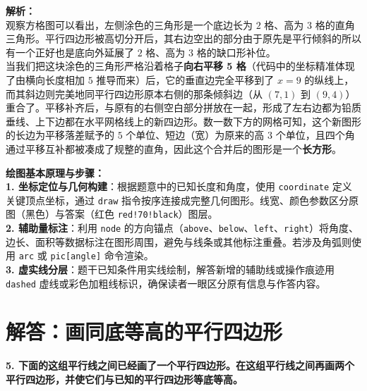 \vspace{0.6cm}
{\small\color{gray}
\textbf{解析：}\\
观察方格图可以看出，左侧涂色的三角形是一个底边长为 $2$ 格、高为 $3$ 格的直角三角形。平行四边形被高切分开后，其右边空出的部分由于原先是平行倾斜的所以有一个正好也是底向外延展了 $2$ 格、高为 $3$ 格的缺口形补位。\\
当我们把这块涂色的三角形严格沿着格子\textbf{向右平移 5 格}（代码中的坐标精准体现了由横向长度相加 $5$ 推导而来）后，它的垂直边完全平移到了 $x=9$ 的纵线上，而其斜边则完美地同平行四边形原本右侧的那条倾斜边（从 $(7,1)$ 到 $(9,4)$）重合了。平移补齐后，与原有的右侧空白部分拼放在一起，形成了左右边都为铅质垂线、上下边都在水平网格线上的新四边形。数一数下方的网格可知，这个新图形的长边为平移落差赋予的 $5$ 个单位、短边（宽）为原来的高 $3$ 个单位，且四个角通过平移互补都被凑成了规整的直角，因此这个合并后的图形是一个\textbf{长方形}。
}


\vspace{0.6cm}

{\small\color{blue!70!black}
\textbf{绘图基本原理与步骤：}\\
\textbf{1. 坐标定位与几何构建}：根据题意中的已知长度和角度，使用 \texttt{coordinate} 定义关键顶点坐标，通过 \texttt{draw} 指令按序连接成完整几何图形。线宽、颜色参数区分原图（黑色）与答案（红色 \texttt{red!70!black}）图层。\\
\textbf{2. 辅助量标注}：利用 \texttt{node} 的方向锚点（\texttt{above}、\texttt{below}、\texttt{left}、\texttt{right}）将角度、边长、面积等数据标注在图形周围，避免与线条或其他标注重叠。若涉及角弧则使用 \texttt{arc} 或 \texttt{pic[angle]} 命令渲染。\\
\textbf{3. 虚实线分层}：题干已知条件用实线绘制，解答新增的辅助线或操作痕迹用 \texttt{dashed} 虚线或彩色加粗线标识，确保读者一眼区分原有信息与作答内容。
}

\newpage



\section{解答：画同底等高的平行四边形}

\vspace{0.4cm}

\noindent\textbf{5. 下面的这组平行线之间已经画了一个平行四边形。在这组平行线之间再画两个平行四边形，并使它们与已知的平行四边形等底等高。}

